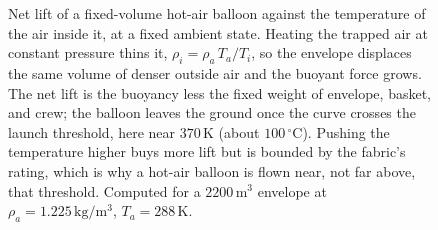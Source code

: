 \begin{figure}[htbp]
\centering
{}
\caption[Hot-air balloon net lift versus internal temperature]{Net lift
of a fixed-volume hot-air balloon against the temperature of the air
inside it, at a fixed ambient state. Heating the trapped air at constant
pressure thins it, $\rho_i=\rho_a\,T_a/T_i$, so the envelope displaces the
same volume of denser outside air and the buoyant force grows. The net
lift is the buoyancy less the fixed weight of envelope, basket, and crew;
the balloon leaves the ground once the curve crosses the launch threshold,
here near $370\,\mathrm{K}$ (about $100\,^{\circ}\mathrm{C}$). Pushing the
temperature higher buys more lift but is bounded by the fabric's rating,
which is why a hot-air balloon is flown near, not far above, that
threshold. Computed for a $2200\,\mathrm{m^3}$ envelope at
$\rho_a=1.225\,\mathrm{kg/m^3}$, $T_a=288\,\mathrm{K}$.}
\label{fig:vol03ch10:hot-air-balloon}
\end{figure}
